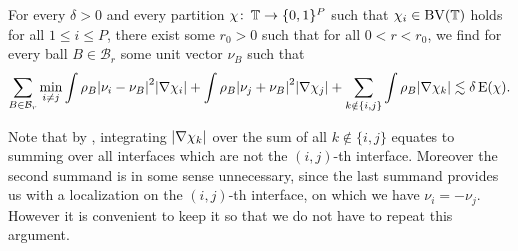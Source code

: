 \begin{lemma}
	\label{localization_lemma_with_normals}
	For every $ \delta > 0 $ and every partition $ \chi \colon \operatorname{\mathbb{T}} \to 
	\{ 0 , 1 \}^{ P } $ such that $ \chi_{ i } \in \operatorname{BV} ( \operatorname{\mathbb{T}} ) $ holds 
	for all $ 1 \leq i \leq P $, there exist some $ r_{ 0 } > 0 $ such that for 
	all $ 0 < r < r_{ 0 } $, we find for every ball $ B \in \mathcal{B}_{ r } $ 
	some unit vector $ \nu_{ B } $ such that
	\begin{equation*}
		\sum_{ B \in \mathcal{B}_{ r } }
		\min_{ i \neq j }
		\int
		\rho_{ B }
		\abs{ \nu_{ i } - \nu_{ B } }^{ 2 }
		\abs{ \nabla \chi_{ i } }
		+
		\int
		\rho_{ B }
		\abs{ \nu_{ j } + \nu_{ B } }^{ 2 }
		\abs{ \nabla \chi_{ j } }
		+
		\sum_{ k \notin \{ i , j \} }
		\int 
		\rho_{ B }
		\abs{ \nabla \chi_{ k } }
		\lesssim
		\delta \operatorname{E} ( \chi ).
	\end{equation*}
\end{lemma}

Note that by , integrating  $ 
\abs{ \nabla \chi_{ k } } $ over the sum of all $ k \notin \{ i , j \} $ 
equates to summing over all interfaces which are not the $ (i,j)$-th interface. 
Moreover the second summand is in some sense unnecessary, since the last 
summand provides us with a localization on the $ (i,j)$-th interface, on which 
we have $ \nu_{ i } = - \nu_{ j } $.
However it is convenient to keep it so that we do not have to repeat this 
argument.

